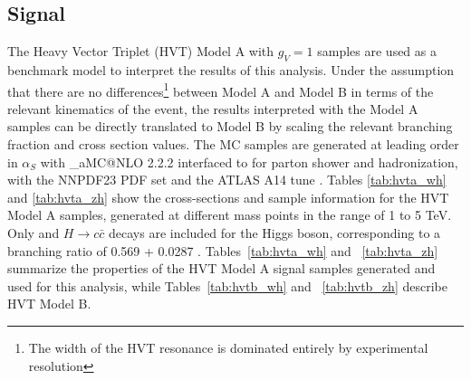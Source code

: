 \subsection{Signal}
The Heavy Vector Triplet (HVT) Model A with $g_{V}=1$ samples are used as a benchmark model to interpret the results of this analysis.
Under the assumption that there are no differences\footnote{The width of the HVT resonance is dominated entirely by experimental resolution} between Model A and Model B in terms of the relevant kinematics of the event, the results interpreted with the Model A samples can be directly translated to Model B by scaling the relevant branching fraction and cross section values.
The MC samples are generated at leading order in $\alpha_S$ with \_aMC@NLO 2.2.2 \cite{Alwall:2014hca} interfaced to  \cite{Sjostrand:2007gs} for parton shower and hadronization, with the NNPDF23 PDF set \cite{Ball:2011mu} and the ATLAS A14 tune \cite{ATL-PHYS-PUB-2014-021}. Tables \ref{tab:hvta_wh} and \ref{tab:hvta_zh} show the cross-sections and sample information for the HVT Model A samples, generated at different mass points in the range of 1 to 5 TeV.
Only \Hbb and $H\rightarrow c\bar{c}$ decays are included for the Higgs boson, corresponding to a branching ratio of 0.569 + 0.0287 \cite{Aad:2015gba}.
Tables~\ref{tab:hvta_wh} and ~\ref{tab:hvta_zh} summarize the properties of the HVT Model A signal samples generated and used for this analysis, while Tables~\ref{tab:hvtb_wh} and ~\ref{tab:hvtb_zh} describe HVT Model B.

